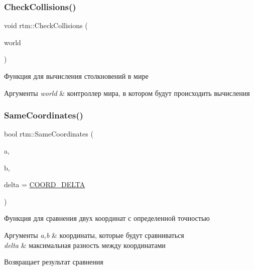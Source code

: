\subsubsection{\texorpdfstring{Check\+Collisions()}{CheckCollisions()}}
{\footnotesize\ttfamily void rtm\+::\+Check\+Collisions (\begin{DoxyParamCaption}\item[{\hyperlink{classrtm_1_1_world_controller}{World\+Controller} $\ast$const}]{world }\end{DoxyParamCaption})}



Функция для вычисления столкновений в мире 


\begin{DoxyParams}{Аргументы}
{\em world} & контроллер мира, в котором будут происходить вычисления \\
\hline
\end{DoxyParams}
\mbox{\label{namespacertm_aa633b82b63b7cff4e9b08bf6a05ec383}} 
\subsubsection{\texorpdfstring{Same\+Coordinates()}{SameCoordinates()}}
{\footnotesize\ttfamily bool rtm\+::\+Same\+Coordinates (\begin{DoxyParamCaption}\item[{float}]{a,  }\item[{float}]{b,  }\item[{float}]{delta = {\ttfamily \hyperlink{namespacertm_a9ae158a8873bdf59aa9872cdada6c657}{C\+O\+O\+R\+D\+\_\+\+D\+E\+L\+TA}} }\end{DoxyParamCaption})}



Функция для сравнения двух координат с определенной точностью 


\begin{DoxyParams}{Аргументы}
{\em a,b} & координаты, которые будут сравниваться \\
\hline
{\em delta} & максимальная разность между координатами \\
\hline
\end{DoxyParams}
\begin{DoxyReturn}{Возвращает}
результат сравнения 
\end{DoxyReturn}
\mbox{\label{namespacertm_a511bf31b8bfc36474baaf915bc11a619}} 
